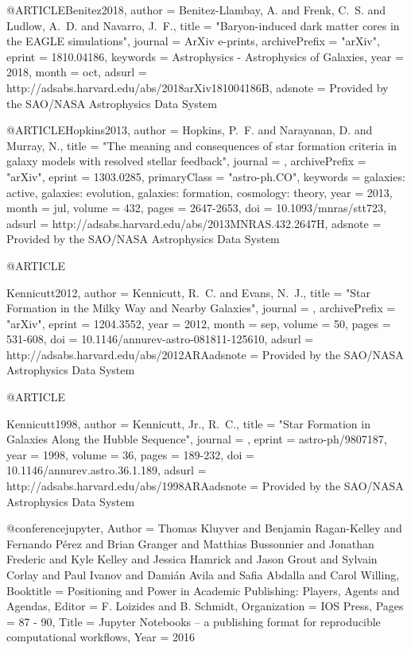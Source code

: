 \documentclass[useAMS,usenatbib]{mnras}
\begin{document}
{{{{{{{{{{{{{{{{@ARTICLE{Benitez2018,
   author = {{Benitez-Llambay}, A. and {Frenk}, C.~S. and {Ludlow}, A.~D. and 
	{Navarro}, J.~F.},
    title = "{Baryon-induced dark matter cores in the EAGLE simulations}",
  journal = {ArXiv e-prints},
archivePrefix = "arXiv",
   eprint = {1810.04186},
 keywords = {Astrophysics - Astrophysics of Galaxies},
     year = 2018,
    month = oct,
   adsurl = {http://adsabs.harvard.edu/abs/2018arXiv181004186B},
  adsnote = {Provided by the SAO/NASA Astrophysics Data System}
}

@ARTICLE{Hopkins2013,
   author = {{Hopkins}, P.~F. and {Narayanan}, D. and {Murray}, N.},
    title = "{The meaning and consequences of star formation criteria in galaxy models with resolved stellar feedback}",
  journal = {\mnras},
archivePrefix = "arXiv",
   eprint = {1303.0285},
 primaryClass = "astro-ph.CO",
 keywords = {galaxies: active, galaxies: evolution, galaxies: formation, cosmology: theory},
     year = 2013,
    month = jul,
   volume = 432,
    pages = {2647-2653},
      doi = {10.1093/mnras/stt723},
   adsurl = {http://adsabs.harvard.edu/abs/2013MNRAS.432.2647H},
  adsnote = {Provided by the SAO/NASA Astrophysics Data System}
}

@ARTICLE{Kennicutt2012,
   author = {{Kennicutt}, R.~C. and {Evans}, N.~J.},
    title = "{Star Formation in the Milky Way and Nearby Galaxies}",
  journal = {\araa},
archivePrefix = "arXiv",
   eprint = {1204.3552},
     year = 2012,
    month = sep,
   volume = 50,
    pages = {531-608},
      doi = {10.1146/annurev-astro-081811-125610},
   adsurl = {http://adsabs.harvard.edu/abs/2012ARAadsnote = {Provided by the SAO/NASA Astrophysics Data System}
}

@ARTICLE{Kennicutt1998,
   author = {{Kennicutt}, Jr., R.~C.},
    title = "{Star Formation in Galaxies Along the Hubble Sequence}",
  journal = {\araa},
   eprint = {astro-ph/9807187},
     year = 1998,
   volume = 36,
    pages = {189-232},
      doi = {10.1146/annurev.astro.36.1.189},
   adsurl = {http://adsabs.harvard.edu/abs/1998ARAadsnote = {Provided by the SAO/NASA Astrophysics Data System}
}

@conference{jupyter,
	Author = {Thomas Kluyver and Benjamin Ragan-Kelley and Fernando P{\'e}rez and Brian Granger and Matthias Bussonnier and Jonathan Frederic and Kyle Kelley and Jessica Hamrick and Jason Grout and Sylvain Corlay and Paul Ivanov and Dami{\'a}n Avila and Safia Abdalla and Carol Willing},
	Booktitle = {Positioning and Power in Academic Publishing: Players, Agents and Agendas},
	Editor = {F. Loizides and B. Schmidt},
	Organization = {IOS Press},
	Pages = {87 - 90},
	Title = {Jupyter Notebooks -- a publishing format for reproducible computational workflows},
	Year = {2016}}

}}}}}}}}}}}}}}}}}}
\end{document}
